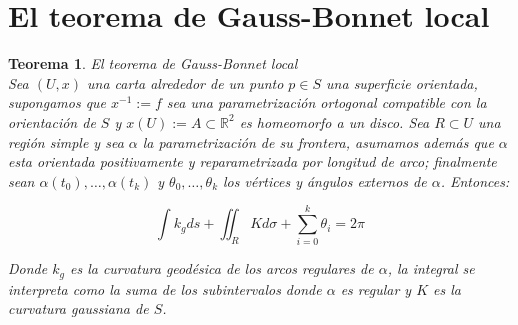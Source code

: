 \documentclass[11pt]{article}
\newcommand{\R}{{\mathbb{R}}}
\newtheorem{theorem}{Teorema}[section]
\begin{document}
\section{El teorema de Gauss-Bonnet local}

\begin{theorem}{El teorema de Gauss-Bonnet local}
	\label{Gauss-Bonnet local}
	\\
	Sea $(U,x)$ una carta alrededor de un punto $p \in S$ una superficie orientada, supongamos que $x^{-1} :=f$ sea una parametrizaci\'on ortogonal compatible con la orientaci\'on de $S$ y $x(U) := A \subset \R^2$ es homeomorfo a un disco. Sea $R \subset U$ una regi\'on simple y sea $\alpha$ la parametrizaci\'on de su frontera, asumamos adem\'as que $\alpha$ esta orientada positivamente y reparametrizada por longitud de arco; finalmente sean $\alpha(t_0) , \dots , \alpha(t_k)$ y $\theta_0, \dots, \theta_k$ los v\'ertices y \'angulos externos de $\alpha$. Entonces:
	
	\begin{equation*}
		\int k_g ds + \iint_{R} Kd\sigma + \sum\limits_{i=0}^{k}{\theta_i} = 2\pi
	\end{equation*}
	
	Donde $k_g$ es la curvatura geod\'esica de los arcos regulares de $\alpha$, la integral se interpreta como la suma de los subintervalos donde $\alpha$ es regular y $K$ es la curvatura gaussiana de $S$.
	
\end{theorem}
\end{document}
